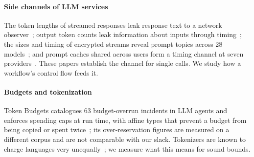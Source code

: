 \paragraph{Side channels of LLM services} The token lengths of streamed responses leak
response text to a network observer~\cite{weiss2024what}; output token counts leak
information about inputs through timing~\cite{zhang2024time}; the sizes and timing of
encrypted streams reveal prompt topics across 28 models~\cite{mcdonald2025whisper}; and
prompt caches shared across users form a timing channel at seven
providers~\cite{gu2025auditing}. These papers establish the channel for single calls. We
study how a workflow's control flow feeds it.

\paragraph{Budgets and tokenization} Token Budgets catalogues 63 budget-overrun incidents
in LLM agents and enforces spending caps at run time, with affine types that prevent a
budget from being copied or spent twice~\cite{khan2026token}; its over-reservation
figures are measured on a different corpus and are not comparable with our slack.
Tokenizers are known to charge languages very unequally~\cite{petrov2023language}; we
measure what this means for sound bounds.
